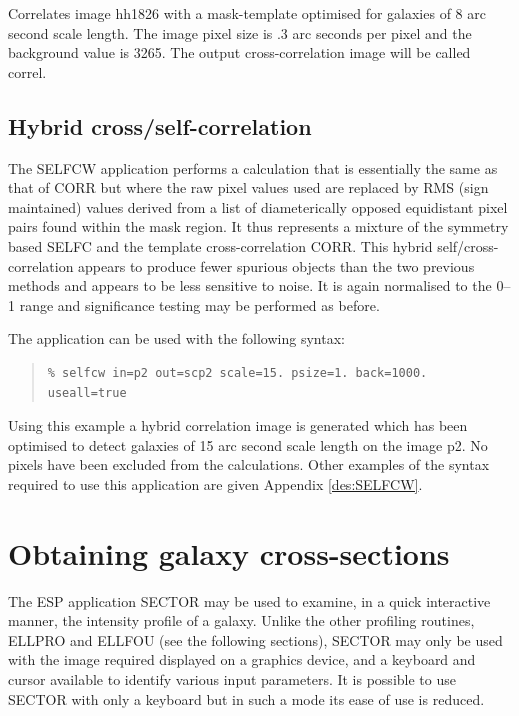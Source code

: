 \documentclass[twoside,11pt]{article}
\newcommand{\xlabel}[1]{}
\newenvironment{myquote}{\begin{quote}\begin{small}}{\end{small}\end{quote}}
\begin{document}
Correlates image hh1826 with a mask-template optimised for galaxies of 
8 arc second scale length. The image pixel size is .3 arc seconds 
per pixel and the background value is 3265. The 
output cross-correlation image will be called correl.

\subsection{Hybrid cross/self-correlation}

The SELFCW application performs a calculation that is essentially the same 
as that of CORR but where the raw pixel values used are replaced by RMS 
(sign maintained) values derived from a list of diameterically opposed 
equidistant pixel pairs found within the mask region. It thus 
represents a mixture of the symmetry based SELFC and the template 
cross-correlation CORR. This hybrid self/cross-correlation appears 
to produce fewer spurious objects than the two previous methods and 
appears to be less sensitive to noise. It is again normalised to the 
0--1 range and significance testing may be performed as
before.

The application can be used with the following syntax:

\begin{myquote}
\begin{verbatim}
% selfcw in=p2 out=scp2 scale=15. psize=1. back=1000. useall=true
\end{verbatim}
\end{myquote}

Using this example a hybrid correlation image is generated which has been 
optimised to detect galaxies of 15 arc second scale length on the 
image p2. No pixels have been excluded from the calculations. 
Other examples of the syntax required to use this application are given
Appendix \ref{des:SELFCW}.


\section{Obtaining galaxy cross-sections}
\xlabel{SECTOR}
\label{sec:obtaining}

The ESP application SECTOR may be used to examine, in a quick 
interactive manner, the intensity profile of a galaxy. Unlike the 
other profiling routines, ELLPRO and ELLFOU (see the following sections), 
SECTOR may only be used with the image required displayed on a graphics 
device, and a keyboard and cursor available to identify various input 
parameters. It is possible to use SECTOR with only a keyboard but in 
such a mode its ease of use is reduced.
\end{document}
